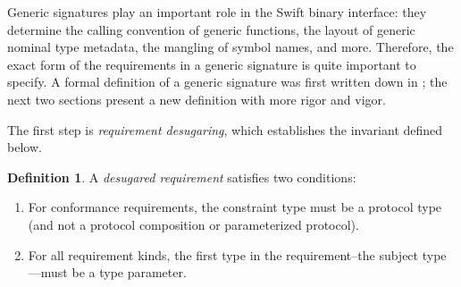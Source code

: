 \documentclass[a4paper,headsepline,bibliography=totoc,toc=flat,fleqn,twoside=semi]{scrbook}
\theoremstyle{definition}
\newtheorem{definition}{Definition}[chapter]
\theoremstyle{definition}
\theoremstyle{definition}
\begin{document}
Generic signatures play an important role in the Swift binary interface: they determine the calling convention of generic functions, the layout of generic nominal type metadata, the mangling of symbol names, and more. Therefore, the exact form of the requirements in a generic signature is quite important to specify. A formal definition of a generic signature was first written down in \cite{gensig}; the next two sections present a new definition with more rigor and vigor.

The first step is \emph{requirement desugaring}, which establishes the invariant defined below.
\begin{definition}\label{desugaredrequirementdef} A \emph{desugared requirement} satisfies two conditions:
\begin{enumerate}
\item For conformance requirements, the constraint type must be a protocol type (and not a protocol composition or parameterized protocol).
\item For all requirement kinds, the first type in the requirement--the subject type---must be a type parameter.
\end{enumerate}
\end{definition}
\end{document}
